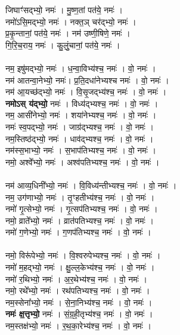 जिघाꣳ॑सद्भ्यो॒ नमः॑ । मु॒ष्ण॒तां पत॑ये॒ नमः॑ ।\\
नमो॑ऽसि॒मद्भ्यो॒ नमः॑ । नक्त॒ञ् चर॑द्भ्यो॒ नमः॑ ।\\
प्र॒कृ॒न्तानां॒ पत॑ये॒ नमः॑ । नम॑ उष्णी॒षिणे॒ नमः॑ ।\\
गि॒रि॒च॒राय॒ नमः॑ । कु॒लुं॒चानां॒ पत॑ये॒  नमः॑ ।\\
\\
नम॒ इषु॑मद्भ्यो॒  नमः॑ । ध॒न्वा॒विभ्य॑श्च॒  नमः॑ । वो॒  नमः॑ ।\\
नम॑ आतन्वा॒नेभ्यो॒ नमः॑। प्र॒ति॒दधा॑नेभ्यश्च  नमः॑ । वो॒ नमः॑ ।\\
नम॑ आ॒यच्छ॑द्भ्यो॒  नमः॑ ।  वि॒सृ॒जद्भ्य॑श्च॒  नमः॑ ।  वो॒ नमः॑ ।\\
\textbf{नमोऽस् य॑द्भ्यो॒} नमः॑ । विध्य॑द्भ्यश्च॒  नमः॑ ।  वो॒ नमः॑ ।\\
नम॒ आसी॑नेभ्यो॒  नमः॑ । शया॑नेभ्यश्च॒  नमः॑ । वो॒ नमः॑ ।\\
नमः॑ स्व॒पद्भ्यो॒  नमः॑ । जाग्र॑द्भ्यश्च॒  नमः॑ ।  वो॒ नमः॑ ।\\
नम॒स्तिष्ठ॑द्भ्यो॒  नमः॑ । धाव॑द्भ्यश्च॒  नमः॑ ।  वो॒ नमः॑ ।\\
नम॑स्स॒भाभ्यो॒  नमः॑ । स॒भाप॑तिभ्यश्च॒ नमः॑ । वो॒ नमः॑ ।\\
नमो॒ अश्वे᳚भ्यो॒  नमः॑ । अश्व॑पतिभ्यश्च॒  नमः॑ । वो॒ नमः॑ ।\\
\\
नम॑ आव्य॒धिनी᳚भ्यो॒  नमः॑ । वि॒विध्य॑न्तीभ्यश्च॒  नमः॑ ।  वो॒ नमः॑ ।\\
नम॒ उग॑णाभ्यो॒ नमः॑ । तृ॒ꣳहतीभ्य॑श्च॒ नमः॑ । वो॒ नमः॑ ।\\
नमो॑ गृ॒त्सेभ्यो॒ नमः॑ । गृ॒त्सप॑तिभ्यश्च॒ नमः॑ । वो॒ नमः॑ ।\\
नमो॒ व्राते᳚भ्यो॒ नमः॑ । व्रात॑पतिभ्यश्च॒ नमः॑ । वो॒ नमः॑ ।\\
नमो॑ ग॒णेभ्यो॒ नमः॑ । ग॒णप॑तिभ्यश्च॒ नमः॑ । वो॒ नमः॑ ।\\
\\
नमो॒ विरू॑पेभ्यो॒ नमः॑ । वि॒श्वरुपेभ्यश्च॒ नमः॑ । वो॒ नमः॑ ।\\
नमो॑ म॒हद्भ्यो॒ नमः॑ । क्षु॒ल्ल॒केभ्य॑श्च॒ नमः॑ । वो॒ नमः॑ ।\\
नमो॑ र॒थिभ्यो॒ नमः॑ । अ॒र॒थेभ्य॑श्च॒ नमः॑ । वो॒ नमः॑ ।\\
नमो॒ रथे᳚भ्यो॒ नमः॑ । रथ॑पतिभ्यश्च॒ नमः॑ । वो॒ नमः॑ ।\\
नम॒स्सेना᳚भ्यो॒ नमः॑ । से॒ना॒निभ्य॑श्च॒ नमः॑ । वो॒ नमः॑ ।\\
\textbf{नमः॑ क्ष॒त्तृभ्यो॒} नमः॑ । सं॒ग्र॒ही॒तृभ्य॑श्च॒ नमः॑ । वो॒ नमः॑ ।\\
नम॒स्तक्ष॑भ्यो॒ नमः॑ । र॒थ॒का॒रेभ्य॑श्च॒ नमः॑ । वो॒ नमः॑ ।\\
